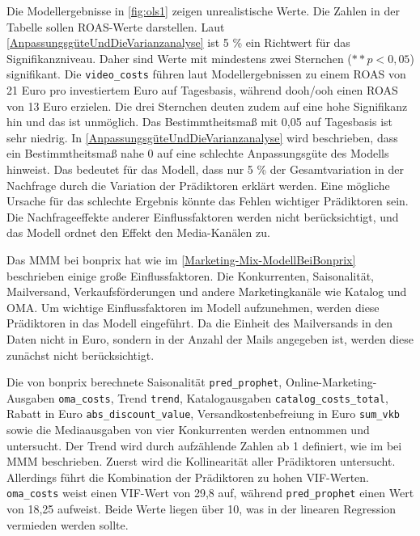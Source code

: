Die Modellergebnisse in \autoref{fig:ols1} zeigen unrealistische Werte. Die Zahlen in der Tabelle sollen \ac{ROAS}-Werte darstellen. Laut \autoref{AnpassungsgüteUndDieVarianzanalyse} ist 5 \% ein Richtwert für das Signifikanzniveau. Daher sind Werte mit mindestens zwei Sternchen (\(**p < 0,05\)) signifikant. Die \verb|video_costs| führen laut Modellergebnissen zu einem \ac{ROAS} von 21 Euro pro investiertem Euro auf Tagesbasis, während \ac{dooh}/\ac{ooh} einen \ac{ROAS} von 13 Euro erzielen. Die drei Sternchen deuten zudem auf eine hohe Signifikanz hin und das ist unmöglich. Das Bestimmtheitsmaß mit 0,05 auf Tagesbasis ist sehr niedrig. In \autoref{AnpassungsgüteUndDieVarianzanalyse} wird beschrieben, dass ein Bestimmtheitsmaß nahe 0 auf eine schlechte Anpassungsgüte des Modells hinweist. Das bedeutet für das Modell, dass nur 5 \% der Gesamtvariation in der Nachfrage durch die Variation der Prädiktoren erklärt werden. Eine mögliche Ursache für das schlechte Ergebnis könnte das Fehlen wichtiger Prädiktoren sein. Die Nachfrageeffekte anderer Einflussfaktoren werden nicht berücksichtigt, und das Modell ordnet den Effekt den Media-Kanälen zu.\par
Das \ac{MMM} bei bonprix hat wie im \autoref{Marketing-Mix-ModellBeiBonprix} beschrieben einige große Einflussfaktoren. Die Konkurrenten, Saisonalität,  Mailversand, Verkaufsförderungen und andere Marketingkanäle wie Katalog und \ac{OMA}. Um wichtige Einflussfaktoren im Modell aufzunehmen, werden diese Prädiktoren in das Modell eingeführt. Da die Einheit des Mailversands in den Daten nicht in Euro, sondern in der Anzahl der Mails angegeben ist, werden diese zunächst nicht berücksichtigt. \par
Die von bonprix berechnete Saisonalität \verb|pred_prophet|, Online-Marketing-Ausgaben \verb|oma_costs|, Trend \verb|trend|, Katalogausgaben \verb|catalog_costs_total|, Rabatt in Euro \verb|abs_discount_value|, Versandkostenbefreiung in Euro \verb|sum_vkb| sowie die Mediaausgaben von vier Konkurrenten werden entnommen und untersucht. Der Trend wird durch aufzählende Zahlen ab 1 definiert, wie im  bei \ac{MMM} beschrieben. Zuerst wird die Kollinearität aller Prädiktoren untersucht. Allerdings führt die Kombination der Prädiktoren zu hohen \ac{VIF}-Werten. \verb|oma_costs| weist einen \ac{VIF}-Wert von 29,8 auf, während \verb|pred_prophet| einen Wert von 18,25 aufweist. Beide Werte liegen über 10, was in der linearen Regression vermieden werden sollte.
\noindent
